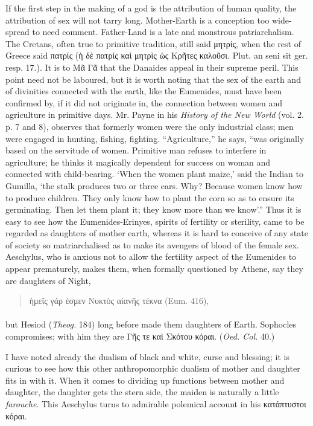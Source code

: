 \documentclass[a4paper, 11pt, oneside, polutonikogreek, english]{article}
\begin{document}
If the first step in the making of a god is the attribution of human quality, the attribution of sex will not tarry long. Mother-Earth is a conception too wide-spread to need comment. Father-Land is a late and monstrous patriarchalism. The Cretans, often true to primitive tradition, still said μητρίς, when the rest of Greece said πατρίς (ἡ δὲ πατρίς καὶ μητρὶς ὡς Κρῆτες καλοῦσι. Plut. an seni sit ger. resp. 17.). It is to Μᾶ Γᾶ that the Danaides appeal in their supreme peril. This point need not be laboured, but it is worth noting that the sex of the earth and of divinities connected with the earth, like the Eumenides, must have been confirmed by, if it did not originate in, the connection between women and agriculture in primitive days. Mr. Payne in his \emph{History of the New World} (vol. 2. p. 7 and 8), observes that formerly women were the only industrial class; men were engaged in hunting, fishing, fighting. ``Agriculture,'' he says, ``was originally based on the servitude of women. Primitive man refuses to interfere in agriculture; he thinks it magically dependent for success on woman and connected with child-bearing. `When the women plant maize,' said the Indian to Gumilla, `the stalk produces two or three ears. Why? Because women know how to produce children. They only know how to plant the corn so as to ensure its germinating. Then let them plant it; they know more than we know'.'' Thus it is easy to see how the Eumenides-Erinyes, spirits of fertility or sterility, came to be regarded as daughters of mother earth, whereas it is hard to conceive of any state of society so matriarchalised as to make its avengers of blood of the female sex. Aeschylus, who is anxious not to allow the fertility aspect of the Eumenides to appear prematurely, makes them, when formally questioned by Athene, say they are daughters of Night,
\begin{quotation}
ἡμεῖς γάρ ἐσμεν Νυκτὸς αἰανῆς τέκνα (Eum. 416),
\end{quotation}
\paragraph{}
but Hesiod (\emph{Theog.} 184) long before made them daughters of Earth. Sophocles compromises; with him they are Γῆς τε καὶ Σκότου κόραι. (\emph{Oed. Col.} 40.)

I have noted already the dualism of black and white, curse and blessing; it is curious to see how this other anthropomorphic dualism of mother and daughter fits in with it. When it comes to dividing up functions between mother and daughter, the daughter gets the stern side, the maiden is naturally a little \emph{farouche}. This Aeschylus turns to admirable polemical account in his κατάπτυστοι κόραι.
\end{document}

